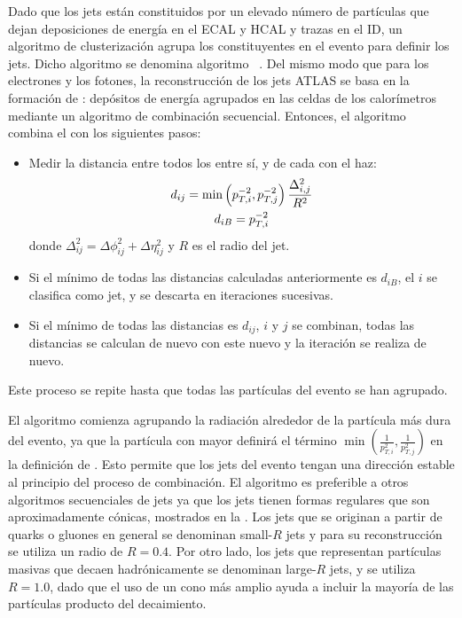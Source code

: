 Dado que los jets están constituidos por un elevado número de partículas que dejan deposiciones de energía en el \ac{ECAL} y \ac{HCAL} y trazas en el \ac{ID}, un algoritmo de clusterizaci\'on agrupa los constituyentes en el evento para definir los jets. Dicho algoritmo se denomina algoritmo \antikt~\cite{AntiKtAlgorithm}. Del mismo modo que para los electrones y los fotones, la reconstrucción de los jets \ac{ATLAS} se basa en la formación de \topos: depósitos de energía agrupados en las celdas de los calorímetros mediante un algoritmo de combinación secuencial. Entonces, el algoritmo \antikt combina el \topos con los siguientes pasos:
\begin{itemize}
    \item Medir la distancia entre todos los \topos entre sí, y de cada \topo con el haz:
        \begin{gather}
            d_{ij} = \min \left( p_{T,i}^{-2}, p_{T,j}^{-2} \right) \frac{\Delta_{i,j}^2}{R^2}\\
            d_{iB} = p_{T,i}^{-2}
        \end{gather}
        donde \(\Delta_{ij}^2 = \Delta\phi_{ij}^2 + \Delta\eta_{ij}^2\) y \(R\) es el radio del jet.
    \item Si el mínimo de todas las distancias calculadas anteriormente es \(d_{iB}\), el \topo \(i\) se clasifica como jet, y se descarta en iteraciones sucesivas.
    \item Si el mínimo de todas las distancias es \(d_{ij}\), \topos \(i\) y \(j\) se combinan, todas las distancias se calculan de nuevo con este nuevo \topo y la iteración se realiza de nuevo.
\end{itemize}
Este proceso se repite hasta que todas las partículas del evento se han agrupado.

El algoritmo \antikt comienza agrupando la radiación alrededor de la partícula más dura del evento, ya que la partícula con mayor \pt definirá el término \(\min \left( \frac{1}{p_{T,i}^2}, \frac{1}{p_{T,j}^2}  \right)\) en la definición de \dij. Esto permite que los jets del evento tengan una dirección estable al principio del proceso de combinación. El algoritmo \antikt es preferible a otros algoritmos secuenciales de jets ya que los jets tienen formas regulares que son aproximadamente cónicas, mostrados en la \Fig{\ref{fig:objects:jets:antikt}}. Los jets que se originan a partir de quarks o gluones en general se denominan small-\(R\) jets y para su reconstrucción se utiliza un radio de \(R=0.4\). Por otro lado, los jets que representan partículas masivas que decaen hadrónicamente se denominan large-\(R\) jets, y se utiliza \(R=1.0\), dado que el uso de un cono más amplio ayuda a incluir la mayoría de las partículas producto del decaimiento.


